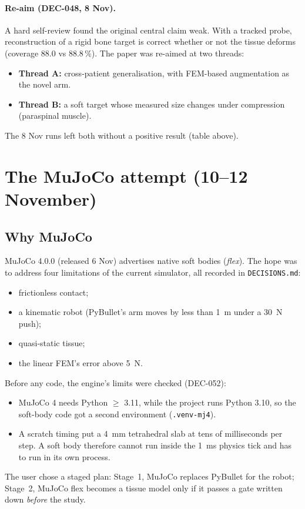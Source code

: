 \documentclass[11pt,a4paper]{article}
\newcommand{\src}[1]{\texttt{\small #1}}
\newcommand{\dec}[1]{\textsf{#1}}
\begin{document}
\paragraph{Re-aim (\dec{DEC-048}, 8 Nov).} A hard self-review found the original central claim weak. With a tracked
probe, reconstruction of a rigid bone target is correct whether or not the tissue deforms (coverage 88.0 vs
88.8\,\%). The paper was re-aimed at two threads:
\begin{itemize}
  \item \textbf{Thread A:} cross-patient generalisation, with FEM-based augmentation as the novel arm.
  \item \textbf{Thread B:} a soft target whose measured size changes under compression (paraspinal muscle).
\end{itemize}
The 8 Nov runs left both without a positive result (table above).

\section{The MuJoCo attempt (10--12 November)}

\subsection{Why MuJoCo}
MuJoCo 4.0.0 (released 6 Nov) advertises native soft bodies (\emph{flex}). The hope was to address four limitations
of the current simulator, all recorded in \src{DECISIONS.md}:
\begin{itemize}
  \item frictionless contact;
  \item a kinematic robot (PyBullet's arm moves by less than 1~\textmu m under a 30~N push);
  \item quasi-static tissue;
  \item the linear FEM's error above 5~N.
\end{itemize}
Before any code, the engine's limits were checked (\dec{DEC-052}):
\begin{itemize}
  \item MuJoCo 4 needs Python $\geq$ 3.11, while the project runs Python 3.10, so the soft-body code got a second
    environment (\src{.venv-mj4}).
  \item A scratch timing put a 4~mm tetrahedral slab at tens of milliseconds per step. A soft body therefore cannot
    run inside the 1~ms physics tick and has to run in its own process.
\end{itemize}
The user chose a staged plan: Stage~1, MuJoCo replaces PyBullet for the robot; Stage~2, MuJoCo flex becomes a
tissue model only if it passes a gate written down \emph{before} the study.
\end{document}
